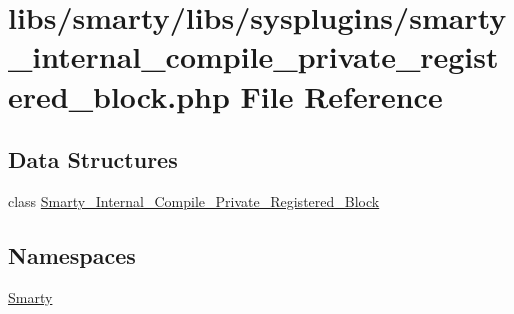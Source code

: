 \hypertarget{smarty__internal__compile__private__registered__block_8php}{}\section{libs/smarty/libs/sysplugins/smarty\+\_\+internal\+\_\+compile\+\_\+private\+\_\+registered\+\_\+block.php File Reference}
\label{smarty__internal__compile__private__registered__block_8php}
\subsection*{Data Structures}
\begin{DoxyCompactItemize}
\item 
class \hyperlink{class_smarty___internal___compile___private___registered___block}{Smarty\+\_\+\+Internal\+\_\+\+Compile\+\_\+\+Private\+\_\+\+Registered\+\_\+\+Block}
\end{DoxyCompactItemize}
\subsection*{Namespaces}
\begin{DoxyCompactItemize}
\item 
 \hyperlink{namespace_smarty}{Smarty}
\end{DoxyCompactItemize}

